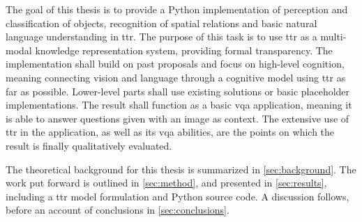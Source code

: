 The goal of this thesis is to provide a Python implementation of perception and classification of objects, recognition of spatial relations and basic natural language understanding in \gls{ttr}.
The purpose of this task is to use \gls{ttr} as a multi-modal knowledge representation system, providing formal transparency.
The implementation shall build on past proposals and focus on high-level cognition, meaning connecting vision and language through a cognitive model using \gls{ttr} as far as possible.
Lower-level parts shall use existing solutions or basic placeholder implementations.
The result shall function as a basic \gls{vqa} application, meaning it is able to answer questions given with an image as context.
The extensive use of \gls{ttr} in the application, as well as its \gls{vqa} abilities, are the points on which the result is finally qualitatively evaluated.

The theoretical background for this thesis is summarized in \autoref{sec:background}.
The work put forward is outlined in \autoref{sec:method}, and presented in \autoref{sec:results}, including a \gls{ttr} model formulation and Python source code.
A discussion follows, before an account of conclusions in \autoref{sec:conclusions}.